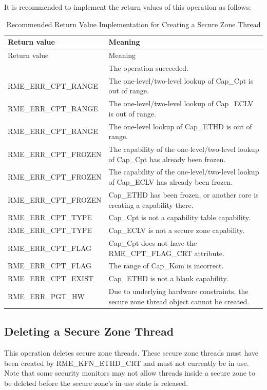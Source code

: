 It is recommended to implement the return values of this operation as follows:

\begin{xltabular}{\textwidth}{@{}>{\hsize\raggedright\arraybackslash}X>{\hsize\raggedright\arraybackslash}X@{}}
\caption{Recommended Return Value Implementation for Creating a Secure Zone Thread}\label{tab:8-101-create-enclave-thread-suggested-return-values}\\
\toprule
Return value & Meaning\tabularnewline
\endfirsthead
\toprule
Return value & Meaning\tabularnewline
\midrule
\endhead
\bottomrule
{} & The operation succeeded.\tabularnewline
    RME\_ERR\_CPT\_RANGE & The one-level/two-level lookup of Cap\_Cpt is out of range.\tabularnewline
    RME\_ERR\_CPT\_RANGE & The one-level/two-level lookup of Cap\_ECLV is out of range.\tabularnewline
    RME\_ERR\_CPT\_RANGE & The one-level lookup of Cap\_ETHD is out of range.\tabularnewline
    RME\_ERR\_CPT\_FROZEN & The capability of the one-level/two-level lookup of Cap\_Cpt has already been frozen.\tabularnewline
    RME\_ERR\_CPT\_FROZEN & The capability of the one-level/two-level lookup of Cap\_ECLV has already been frozen.\tabularnewline
    RME\_ERR\_CPT\_FROZEN & Cap\_ETHD has been frozen, or another core is creating a capability there.\tabularnewline
    RME\_ERR\_CPT\_TYPE & Cap\_Cpt is not a capability table capability.\tabularnewline
    RME\_ERR\_CPT\_TYPE & Cap\_ECLV is not a secure zone capability.\tabularnewline
    RME\_ERR\_CPT\_FLAG & Cap\_Cpt does not have the RME\_CPT\_FLAG\_CRT attribute.\tabularnewline
    RME\_ERR\_CPT\_FLAG & The range of Cap\_Kom is incorrect.\tabularnewline
    RME\_ERR\_CPT\_EXIST & Cap\_ETHD is not a blank capability.\tabularnewline
    RME\_ERR\_PGT\_HW & Due to underlying hardware constraints, the secure zone thread object cannot be created.\tabularnewline
\end{xltabular}
\nopagebreak[4]

\subsection{Deleting a Secure Zone Thread}\label{subsec:8-delete-enclave-thread}

This operation deletes secure zone threads. These secure zone threads must have been created by RME\_KFN\_ETHD\_CRT and must not currently be in use. Note that some security monitors may not allow threads inside a secure zone to be deleted before the secure zone's in-use state is released.

